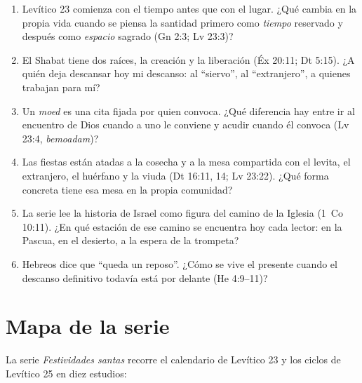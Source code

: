 \documentclass[11pt,letterpaper]{article}
\begin{document}
\begin{enumerate}\setlength{\itemsep}{3pt}
\item Levítico 23 comienza con el tiempo antes que con el lugar. ¿Qué cambia en la propia vida cuando se piensa la santidad primero como \emph{tiempo} reservado y después como \emph{espacio} sagrado (Gn 2:3; Lv 23:3)?
\item El Shabat tiene dos raíces, la creación y la liberación (Éx 20:11; Dt 5:15). ¿A quién deja descansar hoy mi descanso: al ``siervo'', al ``extranjero'', a quienes trabajan para mí?
\item Un \emph{moed} es una cita fijada por quien convoca. ¿Qué diferencia hay entre ir al encuentro de Dios cuando a uno le conviene y acudir cuando él convoca (Lv 23:4, \emph{bemoadam})?
\item Las fiestas están atadas a la cosecha y a la mesa compartida con el levita, el extranjero, el huérfano y la viuda (Dt 16:11, 14; Lv 23:22). ¿Qué forma concreta tiene esa mesa en la propia comunidad?
\item La serie lee la historia de Israel como figura del camino de la Iglesia (1~Co 10:11). ¿En qué estación de ese camino se encuentra hoy cada lector: en la Pascua, en el desierto, a la espera de la trompeta?
\item Hebreos dice que ``queda un reposo''. ¿Cómo se vive el presente cuando el descanso definitivo todavía está por delante (He 4:9--11)?
\end{enumerate}

\section{Mapa de la serie}\label{sec:mapa}

La serie \emph{Festividades santas} recorre el calendario de Levítico 23 y los ciclos de Levítico 25 en diez estudios:
\end{document}

